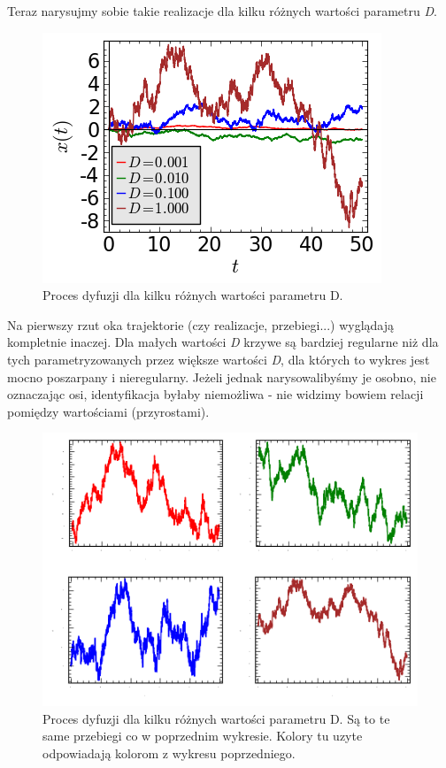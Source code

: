 \documentclass[a4paper,12pt,polish]{sphinxmanual}
\begin{document}
Teraz narysujmy sobie takie realizacje dla kilku różnych wartości parametru \emph{D}.
\begin{figure}[htbp]
\centering
\capstart

\includegraphics{dyf02.png}
\caption{Proces dyfuzji dla kilku różnych wartości parametru D.}\end{figure}

Na pierwszy rzut oka trajektorie (czy realizacje, przebiegi...) wyglądają kompletnie
inaczej. Dla małych wartości \emph{D} krzywe są bardziej regularne niż dla tych
parametryzowanych przez większe wartości \emph{D}, dla których to wykres jest mocno
poszarpany i nieregularny. Jeżeli jednak narysowalibyśmy je osobno, nie oznaczając
osi, identyfikacja byłaby niemożliwa - nie widzimy bowiem relacji pomiędzy
wartościami (przyrostami).
\begin{figure}[htbp]
\centering
\capstart

\includegraphics{dyf.png}
\caption{Proces dyfuzji dla kilku różnych wartości parametru D. Są to te same przebiegi co
w poprzednim wykresie. Kolory tu uzyte odpowiadają kolorom z wykresu poprzedniego.}\end{figure}
\end{document}
